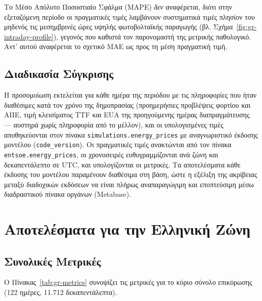 Το Μέσο Απόλυτο Ποσοστιαίο Σφάλμα (MAPE) \emph{δεν} αναφέρεται, διότι στην εξεταζόμενη περίοδο οι πραγματικές τιμές λαμβάνουν συστηματικά τιμές πλησίον του μηδενός τις μεσημβρινές ώρες υψηλής φωτοβολταϊκής παραγωγής (βλ. Σχήμα~\ref{fig:gr-intraday-profile}), γεγονός που καθιστά τον παρονομαστή της μετρικής παθολογικό. Αντ' αυτού αναφέρεται το σχετικό MAE ως προς τη μέση πραγματική τιμή.

\subsection{Διαδικασία Σύγκρισης}
\label{subsec:comparison-procedure}

Η προσομοίωση εκτελείται για κάθε ημέρα της περιόδου με τις πληροφορίες που ήταν διαθέσιμες κατά τον χρόνο της δημοπρασίας (προημερήσιες προβλέψεις φορτίου και ΑΠΕ, τιμή κλεισίματος TTF και EUA της προηγούμενης ημέρας διαπραγμάτευσης --- αυστηρά χωρίς πληροφορία από το μέλλον), και οι υπολογισμένες τιμές αποθηκεύονται στον πίνακα \texttt{simulations.energy\_prices} με αναγνωριστικό έκδοσης μοντέλου (\texttt{code\_version}). Οι πραγματικές τιμές ανακτώνται από τον πίνακα \texttt{entsoe.energy\_prices}, οι χρονοσειρές ευθυγραμμίζονται ανά ζώνη και δεκαπεντάλεπτο σε UTC, και υπολογίζονται οι μετρικές. Τα αποτελέσματα κάθε έκδοσης του μοντέλου παραμένουν διαθέσιμα στη βάση, ώστε η εξέλιξη της ακρίβειας μεταξύ διαδοχικών εκδόσεων να είναι πλήρως αναπαραγώγιμη και εποπτεύσιμη μέσω διαδραστικού πίνακα οργάνων (Metabase).


\section{Αποτελέσματα για την Ελληνική Ζώνη}
\label{sec:price-comparison}

\subsection{Συνολικές Μετρικές}
\label{subsec:gr-results}

Ο Πίνακας~\ref{tab:gr-metrics} συνοψίζει τις μετρικές για το κύριο σύνολο επικύρωσης (122 ημέρες, 11.712 δεκαπεντάλεπτα).

